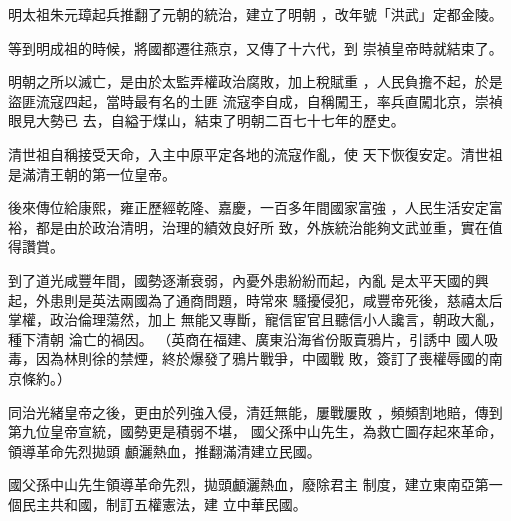 \documentclass[avery5371,grid]{flashcards}
\begin{document}
{明太祖朱元璋起兵推翻了元朝的統治，建立了明朝
，改年號「洪武」定都金陵。} %
{} %

{等到明成祖的時候，將國都遷往燕京，又傳了十六代，到
崇禎皇帝時就結束了。} %
{} %

{明朝之所以滅亡，是由於太監弄權政治腐敗，加上稅賦重
，人民負擔不起，於是盜匪流寇四起，當時最有名的土匪
流寇李自成，自稱闖王，率兵直闖北京，崇禎眼見大勢已
去，自縊于煤山，結束了明朝二百七十七年的歷史。} %
{} %

{清世祖自稱接受天命，入主中原平定各地的流寇作亂，使
天下恢復安定。清世祖是滿清王朝的第一位皇帝。} %
{} %






{後來傳位給康熙，雍正歷經乾隆、嘉慶，一百多年間國家富強
，人民生活安定富裕，都是由於政治清明，治理的績效良好所
致，外族統治能夠文武並重，實在值得讚賞。} %
{} %

{到了道光咸豐年間，國勢逐漸衰弱，內憂外患紛紛而起，內亂
是太平天國的興起，外患則是英法兩國為了通商問題，時常來
騷擾侵犯，咸豐帝死後，慈禧太后掌權，政治倫理蕩然，加上
無能又專斷，寵信宦官且聽信小人讒言，朝政大亂，種下清朝
淪亡的禍因。} %
{（英商在福建、廣東沿海省份販賣鴉片，引誘中
國人吸毒，因為林則徐的禁煙，終於爆發了鴉片戰爭，中國戰
敗，簽訂了喪權辱國的南京條約。）} %

{同治光緒皇帝之後，更由於列強入侵，清廷無能，屢戰屢敗
，頻頻割地賠，傳到第九位皇帝宣統，國勢更是積弱不堪，
國父孫中山先生，為救亡圖存起來革命，領導革命先烈拋頭
顱灑熱血，推翻滿清建立民國。} %
{} %

{國父孫中山先生領導革命先烈，拋頭顱灑熱血，廢除君主
制度，建立東南亞第一個民主共和國，制訂五權憲法，建
立中華民國。} %
{} %
\end{document}
